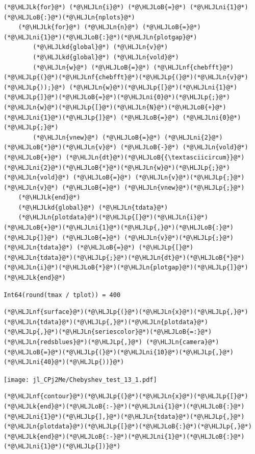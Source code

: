 \documentclass[12pt,a4paper]{article}
\newcommand{\HLJLk}[1]{\textcolor[RGB]{148,91,176}{\textbf{#1}}}
\newcommand{\HLJLkd}[1]{\textcolor[RGB]{214,102,97}{\textit{#1}}}
\newcommand{\HLJLn}[1]{#1}
\newcommand{\HLJLnf}[1]{\textcolor[RGB]{66,102,213}{#1}}
\newcommand{\HLJLni}[1]{\textcolor[RGB]{59,151,46}{#1}}
\newcommand{\HLJLoB}[1]{\textcolor[RGB]{102,102,102}{\textbf{#1}}}
\newcommand{\HLJLp}[1]{#1}
\begin{document}
\begin{lstlisting}
(*@\HLJLk{for}@*) (*@\HLJLn{i}@*) (*@\HLJLoB{=}@*) (*@\HLJLni{1}@*)(*@\HLJLoB{:}@*)(*@\HLJLn{nplots}@*)
    (*@\HLJLk{for}@*) (*@\HLJLn{n}@*) (*@\HLJLoB{=}@*) (*@\HLJLni{1}@*)(*@\HLJLoB{:}@*)(*@\HLJLn{plotgap}@*)
        (*@\HLJLkd{global}@*) (*@\HLJLn{v}@*)
        (*@\HLJLkd{global}@*) (*@\HLJLn{vold}@*)
        (*@\HLJLn{w}@*) (*@\HLJLoB{=}@*) (*@\HLJLnf{chebfft}@*)(*@\HLJLp{(}@*)(*@\HLJLnf{chebfft}@*)(*@\HLJLp{(}@*)(*@\HLJLn{v}@*)(*@\HLJLp{));}@*) (*@\HLJLn{w}@*)(*@\HLJLp{[}@*)(*@\HLJLni{1}@*)(*@\HLJLp{]}@*)(*@\HLJLoB{=}@*)(*@\HLJLni{0}@*)(*@\HLJLp{;}@*) (*@\HLJLn{w}@*)(*@\HLJLp{[}@*)(*@\HLJLn{N}@*)(*@\HLJLoB{+}@*)(*@\HLJLni{1}@*)(*@\HLJLp{]}@*) (*@\HLJLoB{=}@*) (*@\HLJLni{0}@*)(*@\HLJLp{;}@*)
        (*@\HLJLn{vnew}@*) (*@\HLJLoB{=}@*) (*@\HLJLni{2}@*)(*@\HLJLoB{*}@*)(*@\HLJLn{v}@*) (*@\HLJLoB{-}@*) (*@\HLJLn{vold}@*) (*@\HLJLoB{+}@*) (*@\HLJLn{dt}@*)(*@\HLJLoB{{\textasciicircum}}@*)(*@\HLJLni{2}@*)(*@\HLJLoB{*}@*)(*@\HLJLn{w}@*)(*@\HLJLp{;}@*) (*@\HLJLn{vold}@*) (*@\HLJLoB{=}@*) (*@\HLJLn{v}@*)(*@\HLJLp{;}@*) (*@\HLJLn{v}@*) (*@\HLJLoB{=}@*) (*@\HLJLn{vnew}@*)(*@\HLJLp{;}@*)
    (*@\HLJLk{end}@*)
    (*@\HLJLkd{global}@*) (*@\HLJLn{tdata}@*)
    (*@\HLJLn{plotdata}@*)(*@\HLJLp{[}@*)(*@\HLJLn{i}@*)(*@\HLJLoB{+}@*)(*@\HLJLni{1}@*)(*@\HLJLp{,}@*)(*@\HLJLoB{:}@*)(*@\HLJLp{]}@*) (*@\HLJLoB{=}@*) (*@\HLJLn{v}@*)(*@\HLJLp{;}@*) (*@\HLJLn{tdata}@*) (*@\HLJLoB{=}@*) (*@\HLJLp{[}@*)(*@\HLJLn{tdata}@*)(*@\HLJLp{;}@*)(*@\HLJLn{dt}@*)(*@\HLJLoB{*}@*)(*@\HLJLn{i}@*)(*@\HLJLoB{*}@*)(*@\HLJLn{plotgap}@*)(*@\HLJLp{]}@*)
(*@\HLJLk{end}@*)
\end{lstlisting}

\begin{lstlisting}
Int64(round(tmax / tplot)) = 400
\end{lstlisting}


\begin{lstlisting}
(*@\HLJLnf{surface}@*)(*@\HLJLp{(}@*)(*@\HLJLn{x}@*)(*@\HLJLp{,}@*)(*@\HLJLn{tdata}@*)(*@\HLJLp{,}@*)(*@\HLJLn{plotdata}@*)(*@\HLJLp{,}@*)(*@\HLJLn{seriescolor}@*)(*@\HLJLoB{=:}@*)(*@\HLJLn{redsblues}@*)(*@\HLJLp{,}@*) (*@\HLJLn{camera}@*)(*@\HLJLoB{=}@*)(*@\HLJLp{(}@*)(*@\HLJLni{10}@*)(*@\HLJLp{,}@*)(*@\HLJLni{40}@*)(*@\HLJLp{))}@*)
\end{lstlisting}

\texttt{[image: jl\_CPj2Me/Chebyshev\_test\_13\_1.pdf]}

\begin{lstlisting}
(*@\HLJLnf{contour}@*)(*@\HLJLp{(}@*)(*@\HLJLn{x}@*)(*@\HLJLp{[}@*)(*@\HLJLk{end}@*)(*@\HLJLoB{:-}@*)(*@\HLJLni{1}@*)(*@\HLJLoB{:}@*)(*@\HLJLni{1}@*)(*@\HLJLp{],}@*)(*@\HLJLn{tdata}@*)(*@\HLJLp{,}@*)(*@\HLJLn{plotdata}@*)(*@\HLJLp{[}@*)(*@\HLJLoB{:}@*)(*@\HLJLp{,}@*)(*@\HLJLk{end}@*)(*@\HLJLoB{:-}@*)(*@\HLJLni{1}@*)(*@\HLJLoB{:}@*)(*@\HLJLni{1}@*)(*@\HLJLp{])}@*)
\end{lstlisting}
\end{document}
